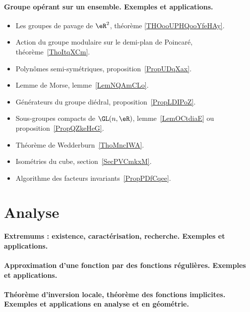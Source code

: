 \paragraph{Groupe opérant sur un ensemble. Exemples et applications.}
\begin{itemize}
	\item Les groupes de pavage de \( \eR^2\), théorème \ref{THOooUPHQooYfeHAy}.
	\item Action du groupe modulaire sur le demi-plan de Poincaré, théorème~\ref{ThoItqXCm}.
	\item Polynômes semi-symétriques, proposition~\ref{PropUDqXax}.
	\item Lemme de Morse, lemme~\ref{LemNQAmCLo}.
	\item Générateurs du groupe diédral, proposition~\ref{PropLDIPoZ}.
	\item Sous-groupes compacts de \( \GL(n,\eR)\), lemme~\ref{LemOCtdiaE} ou proposition~\ref{PropQZkeHeG}.
	\item Théorème de Wedderburn~\ref{ThoMncIWA}.
	\item Isométries du cube, section~\ref{SecPVCmkxM}.
	\item Algorithme des facteurs invariants~\ref{PropPDfCqee}.
\end{itemize}


\section{Analyse}

\paragraph{Extremums : existence, caractérisation, recherche. Exemples et applications.}
\paragraph{Approximation d'une fonction par des fonctions régulières.  Exemples et applications.}
\paragraph{Théorème d'inversion locale, théorème des fonctions implicites. Exemples et applications en analyse et en géométrie.}
